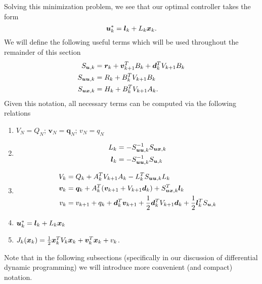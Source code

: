Solving this minimization problem, we see that our optimal controller takes the form
\begin{equation}
    \bm{u}^*_{k} =\bm{l}_k +  L_{k} \bm{x}_{k}.
\end{equation}
We will define the following useful terms which will be used throughout the remainder of this section
\begin{align}
\label{eq:Qk_lqr}
    S_{\bm{u},k} &= \bm{r}_k +  \bm{v}^T_{k+1} B_k + \bm{d}^T_k V_{k+1} B_k \\
    S_{\bm{u} \bm{u},k} &= R_k + B_k^T V_{k+1} B_k\\
    S_{\bm{u} \bm{x},k} &= H_k + B_k^T V_{k+1} A_k.
\end{align}
Given this notation, all necessary terms can be computed via the following relations
\begin{enumerate}
    \item $V_N = Q_N$; $\bm{v}_N = \bm{q}_N$; $v_N = q_N$
    \item \begin{align} L_k &= - S_{\bm{u} \bm{u},k}^{-1} S_{\bm{u} \bm{x},k}\\
    \bm{l}_k &= - S_{\bm{u} \bm{u},k}^{-1} S_{\bm{u},k}
    \end{align}
    \item 
    \begin{align}
        V_k &= Q_{k}  + A_k^T V_{k+1} A_k - L_k^T S_{\bm{u} \bm{u},k} L_k\\
        \bm{v}_k &= \bm{q}_k + A_k^T (\bm{v}_{k+1} + V_{k+1} \bm{d}_k) + S^T_{\bm{u} \bm{x},k} \bm{l}_k \\
        v_k &= v_{k+1} + q_k + \bm{d}_k^T \bm{v}_{k+1} + \frac{1}{2} \bm{d}_k^T V_{k+1} \bm{d}_k + \frac{1}{2} \bm{l}_k^T S_{\bm{u},k}
    \end{align}
    \item $\bm{u}^*_{k} =\bm{l}_k +  L_{k} \bm{x}_{k}$
    \item $J_k(\bm{x}_k) = \frac{1}{2}\bm{x}_k^T V_k \bm{x}_k + \bm{v}_k^T \bm{x}_k + v_k$.
\end{enumerate}
Note that in the following subsections (specifically in our discussion of differential dynamic programming) we will introduce more convenient (and compact) notation. 

